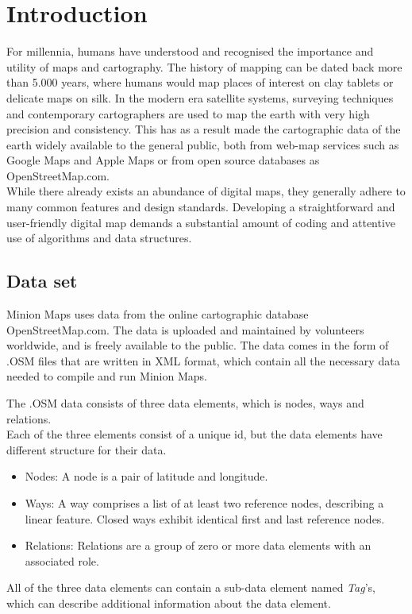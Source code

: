 \section{Introduction}
For millennia, humans have understood and recognised the importance and utility of maps and cartography. The history of mapping can be dated back more than 5.000 years, where humans would map places of interest on clay tablets or delicate maps on silk. In the modern era satellite systems, surveying techniques and contemporary cartographers are used to map the earth with very high precision and consistency. 
This has as a result made the cartographic data of the earth widely available to the general public, both from web-map services such as Google Maps and Apple Maps or from open source databases as OpenStreetMap.com.\cite*{littertur/icsm} \\
\linebreak
While there already exists an abundance of digital maps, they generally adhere to many common features and design standards. Developing a straightforward and user-friendly digital map demands a substantial amount of coding and attentive use of algorithms and data structures. 

\subsection{Data set}
Minion Maps uses data from the online cartographic database OpenStreetMap.com. The data is uploaded and maintained by volunteers worldwide, and is freely available to the public.\cite*{osm} 
The data comes in the form of .OSM files that are written in XML format, which contain all the necessary data needed to compile and run Minion Maps.
\par	The .OSM data consists of three data elements, which is nodes, ways and relations.   
\\Each of the three elements consist of a unique id, but the data elements have different structure for their data.\cite*{osm/XMLReader-Writer}
\begin{itemize}
    \item Nodes: A node is a pair of latitude and longitude.
    \item Ways: A way comprises a list of at least two reference nodes, describing a linear feature. Closed ways exhibit identical first and last reference nodes. 
    \item Relations: Relations are a group of zero or more data elements with an associated role. 
\end{itemize}
All of the three data elements can contain a sub-data element named \textit{Tag}’s, which can describe additional information about the data element.  
